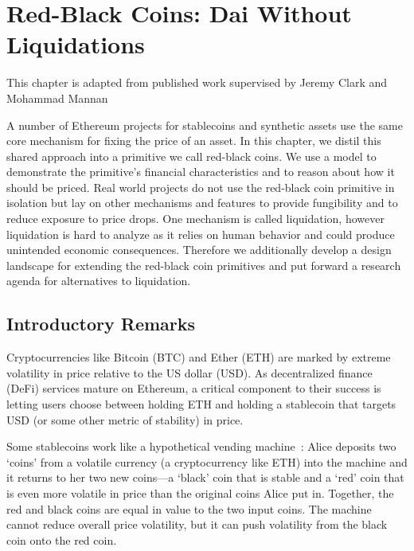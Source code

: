 \chapter{Red-Black Coins: Dai Without Liquidations} \label{ch:dai}
This chapter is adapted from published work supervised by Jeremy Clark and Mohammad Mannan~\cite{salehi2021red}

A number of Ethereum projects for stablecoins and synthetic assets use the same core mechanism for fixing the price of an asset. In this chapter, we distil this shared approach into a primitive we call red-black coins. We use a model to demonstrate the primitive's financial characteristics and to reason about how it should be priced. Real world projects do not use the red-black coin primitive in isolation but lay on other mechanisms and features to provide fungibility and to reduce exposure to price drops. One mechanism is called liquidation, however liquidation is hard to analyze as it relies on human behavior and could produce unintended economic consequences. Therefore we additionally develop a design landscape for extending the red-black coin primitives and put forward a research agenda for alternatives to liquidation.

\section{Introductory Remarks}

Cryptocurrencies like Bitcoin (BTC) and Ether (ETH) are marked by extreme volatility in price relative to the US dollar (USD). As decentralized finance (DeFi) services mature on Ethereum, a critical component to their success is letting users choose between holding ETH and holding a stablecoin that targets USD (or some other metric of stability) in price.

Some stablecoins work like a hypothetical vending machine~\cite{CDM20}: Alice deposits two `coins' from a volatile currency (\eg a cryptocurrency like ETH) into the machine and it returns to her two new coins---a `black' coin that is stable and a `red' coin that is even more volatile in price than the original coins Alice put in. Together, the red and black coins are equal in value to the two input coins. The machine cannot reduce overall price volatility, but it can push volatility from the black coin onto the red coin. 

